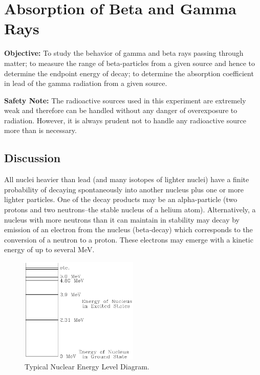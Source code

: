 \chapter{Absorption of Beta and Gamma Rays}
\textbf{Objective:} To study the behavior of gamma and beta rays passing through matter; to measure the range of beta-particles from a given source and hence to determine the endpoint energy of decay; to determine the absorption coefficient in lead of the gamma radiation from a given source.\myskip

\textbf{Safety Note:} The radioactive sources used in this experiment are extremely weak and therefore can be handled without any danger of overexposure to radiation. However, it is always prudent not to handle any radioactive source more than is necessary.

\section{Discussion}
All nuclei heavier than lead (and many isotopes of lighter nuclei) have a finite probability of decaying spontaneously into another nucleus plus one or more lighter particles. One of the decay products may be an alpha-particle (two protons and two neutrons--the stable nucleus of a helium atom). Alternatively, a nucleus with more neutrons than it can maintain in stability may decay by emission of an electron from the nucleus (beta-decay) which corresponds to the conversion of a neutron to a proton. These electrons may emerge with a kinetic energy of up to several MeV.\myskip
\begin{figure}[h]
\centering
\includegraphics[width=0.5\textwidth]{./Exp10/pic/image1.png}
\caption{Typical Nuclear Energy Level Diagram.}
\label{fig:level}
\end{figure} 

